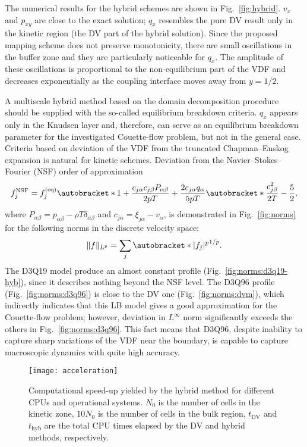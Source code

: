 \documentclass[]{elsarticle} %
\DeclarePairedDelimiter\autobracket()       %
\newcommand{\br}[1]{\autobracket*{#1}}
\newcommand{\xiai}{\xi_{j \alpha}}
\newcommand{\cai}{c_{j \alpha}}
\newcommand{\caj}{c_{j \beta}}
\newcommand{\equil}[1]{#1^\mathrm{(eq)}}
\begin{document}
{%
The numerical results for the hybrid schemes are shown in Fig.~\ref{fig:hybrid}.
\(v_x\) and \(p_{xy}\) are close to the exact solution;
\(q_x\) resembles the pure DV result only in the kinetic region (the DV part of the hybrid solution).
Since the proposed mapping scheme does not preserve monotonicity,
there are small oscillations in the buffer zone and they are particularly noticeable for \(q_x\).
The amplitude of these oscillations is proportional to the non-equilibrium part of the VDF
and decreases exponentially as the coupling interface moves away from \(y=1/2\).

A multiscale hybrid method based on the domain decomposition procedure should be supplied with the so-called equilibrium breakdown criteria.
\(q_x\) appears only in the Knudsen layer and, therefore, can serve as an equilibrium breakdown parameter
for the investigated Couette-flow problem, but not in the general case.
Criteria based on deviation of the VDF from the truncated Chapman--Enskog expansion is natural for kinetic schemes.
Deviation from the Navier--Stokes--Fourier (NSF) order of approximation~\cite{Zhang2014}
\begin{equation}\label{eq:NSF}
    f^{\mathrm{NSF}}_j = \equil{f}_j\br{
        1 + \frac{\cai\caj P_{\alpha\beta}}{2pT} + \frac{2\cai q_\alpha}{5pT}\br{\frac{\caj^2}{2T} - \frac52} },
\end{equation}
where \(P_{\alpha\beta} = p_{\alpha\beta} - \rho T\delta_{\alpha\beta}\) and \(\cai = \xiai - v_\alpha\),
is demonstrated in Fig.~\ref{fig:norms} for the following norms in the discrete velocity space:
\begin{equation}\label{eq:norms}
    \|f\|_{L^p} = \sum_j \br{|f_j|^p}^{1/p}.
\end{equation}
The D3Q19 model produce an almost constant profile (Fig.~\ref{fig:norms:d3q19-hyb}), since it describes nothing beyond the NSF level.
The D3Q96 profile (Fig.~\ref{fig:norms:d3q96}) is close to the DV one (Fig.~\ref{fig:norms:dvm}),
which indirectly indicates that this LB model gives a good approximation for the Couette-flow problem;
however, deviation in \(L^\infty\) norm significantly exceeds the others in Fig.~\ref{fig:norms:d3q96}.
This fact means that D3Q96, despite inability to capture sharp variations of the VDF near the boundary,
is capable to capture macroscopic dynamics with quite high accuracy.

\begin{figure}
    \centering
    \texttt{[image: acceleration]}
    \caption{
        Computational speed-up yielded by the hybrid method for different CPUs and operational systems.
        $N_0$ is the number of cells in the kinetic zone, $10N_0$ is the number of cells in the bulk region,
        $t_\mathrm{DV}$ and $t_\mathrm{hyb}$ are the total CPU times elapsed by the DV and hybrid methods, respectively.
    }\label{fig:speed-up}
\end{figure}

}
\end{document}
